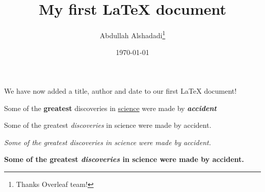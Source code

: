 \documentclass[12pt, letterpaper]{article}
\title{My first LaTeX document}
\author{Abdullah Alshadadi\thanks{Thanks Overleaf team!}}
\date{\today}
\begin{document}
	\maketitle
	We have now added a title, author and date to our first \LaTeX{} document!
	
	
	Some of the \textbf{greatest}
	discoveries in \underline{science}
	were made by \textbf{\textit{accident}}
	
	Some of the greatest \emph{discoveries} in science 
	were made by accident.
	
	\textit{Some of the greatest \emph{discoveries} 
		in science were made by accident.}
	
	\textbf{Some of the greatest \emph{discoveries} 
		in science were made by accident.}
	
\end{document}
